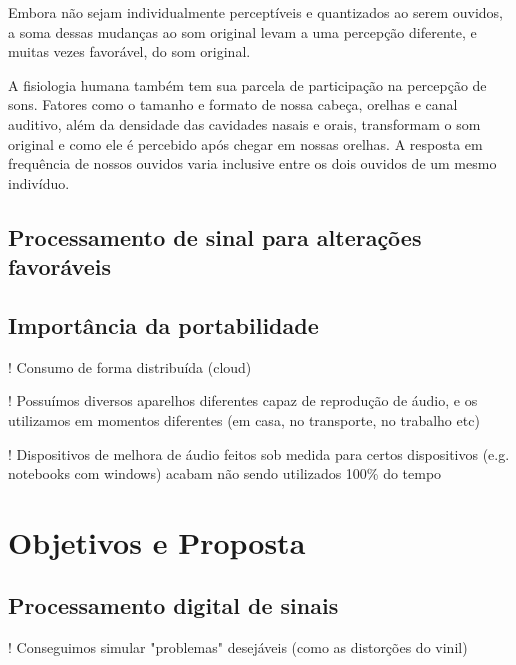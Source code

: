 Embora não sejam individualmente perceptíveis e quantizados ao serem ouvidos, a soma dessas mudanças ao som original levam a uma percepção diferente, e muitas vezes favorável, do som original.


A fisiologia humana também tem sua parcela de participação na percepção de sons. Fatores como o tamanho e formato de nossa cabeça, orelhas e canal auditivo, além da densidade das cavidades nasais e orais, transformam o som original e como ele é percebido após chegar em nossas orelhas.  A resposta em frequência de nossos ouvidos varia inclusive entre os dois ouvidos de um mesmo indivíduo.


\subsection{Processamento de sinal para alterações favoráveis}\label{subsec:processamentoSinalAlteracoesFavoraveis}
\subsection{Importância da portabilidade}\label{subsec:importanciaPortabilidade}

\color{orange}
! Consumo de forma distribuída (cloud)

! Possuímos diversos aparelhos diferentes capaz de reprodução de áudio, e os utilizamos em momentos diferentes (em casa, no transporte, no trabalho etc)

! Dispositivos de melhora de áudio feitos sob medida para certos dispositivos (e.g. notebooks com windows) acabam não sendo utilizados 100\% do tempo

\color{black}

\section{Objetivos e Proposta}
\subsection{Processamento digital de sinais}
! Conseguimos simular "problemas" desejáveis (como as distorções do vinil)

